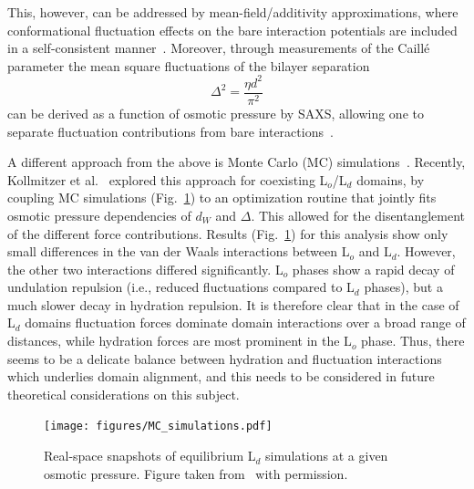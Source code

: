 \documentclass[8.5pt,twoside,twocolumn]{article}
\begin{document}
This, however, can be addressed by mean-field/additivity approximations, where conformational fluctuation effects on the
bare interaction potentials are included in a self-consistent manner~\cite{Sornette.1986,Evans.1986,Podgornik.1992,Mecke.2003}. Moreover, through measurements of the Caill\'{e} parameter the mean square fluctuations of the bilayer separation
%
\begin{equation}
	\Delta^2 = \frac{\eta d^2}{\pi^2}
\end{equation}
%
can be derived as a function of osmotic pressure by SAXS, allowing one to separate fluctuation contributions from bare interactions~\cite{Petrache.1998}.

A different approach from the above is Monte Carlo (MC) simulations~\cite{Gouliaev.1998,Gouliaev.1998b}. Recently, Kollmitzer et al.~\cite{Kollmitzer.2015} explored this approach for coexisting L$_o$/L$_d$ domains, by coupling MC simulations (Fig.~\ref{fig:MC_simulations}) to an optimization routine that jointly fits osmotic pressure dependencies of $d_W$ and $\Delta$. This allowed for the disentanglement of the different force contributions. Results (Fig.~\ref{fig:MC_simulations}) for this analysis show only small differences in the van der Waals interactions between L$_o$ and L$_d$. However, the other two interactions differed significantly. L$_o$ phases show a rapid decay of undulation repulsion (i.e., reduced fluctuations compared to L$_d$ phases), but a much slower decay in hydration repulsion. It is therefore clear that in the case of L$_d$ domains fluctuation forces dominate domain interactions over a broad range of distances, while hydration forces are most prominent in the L$_o$ phase. Thus, there seems to be a delicate balance between hydration and fluctuation interactions which underlies domain alignment, and this needs to be considered in future theoretical considerations on this subject.

\begin{figure} [t]
	\centering
	\texttt{[image: figures/MC\_simulations.pdf]}
	\caption{Real-space snapshots of equilibrium L$_d$ simulations at a given osmotic pressure. Figure taken from~\cite{Kollmitzer.2015} with permission.}
	\label{fig:MC_simulations}
\end{figure}
\end{document}
